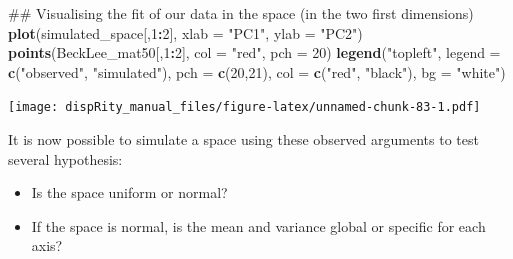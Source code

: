 \documentclass[]{book}
\newenvironment{Shaded}{\begin{snugshade}}{\end{snugshade}}
\newcommand{\KeywordTok}[1]{\textcolor[rgb]{0.13,0.29,0.53}{\textbf{#1}}}
\newcommand{\DataTypeTok}[1]{\textcolor[rgb]{0.13,0.29,0.53}{#1}}
\newcommand{\DecValTok}[1]{\textcolor[rgb]{0.00,0.00,0.81}{#1}}
\newcommand{\StringTok}[1]{\textcolor[rgb]{0.31,0.60,0.02}{#1}}
\newcommand{\OperatorTok}[1]{\textcolor[rgb]{0.81,0.36,0.00}{\textbf{#1}}}
\newcommand{\NormalTok}[1]{#1}
\providecommand{\tightlist}{%
  \setlength{\itemsep}{0pt}\setlength{\parskip}{0pt}}
\theoremstyle{definition}
\theoremstyle{definition}
\theoremstyle{remark}
\begin{document}
\begin{Shaded}
\begin{Highlighting}[]
\NormalTok{## Visualising the fit of our data in the space (in the two first dimensions)}
\KeywordTok{plot}\NormalTok{(simulated_space[,}\DecValTok{1}\OperatorTok{:}\DecValTok{2}\NormalTok{], }\DataTypeTok{xlab =} \StringTok{"PC1"}\NormalTok{, }\DataTypeTok{ylab =} \StringTok{"PC2"}\NormalTok{)}
\KeywordTok{points}\NormalTok{(BeckLee_mat50[,}\DecValTok{1}\OperatorTok{:}\DecValTok{2}\NormalTok{], }\DataTypeTok{col =} \StringTok{"red"}\NormalTok{, }\DataTypeTok{pch =} \DecValTok{20}\NormalTok{)}
\KeywordTok{legend}\NormalTok{(}\StringTok{"topleft"}\NormalTok{, }\DataTypeTok{legend =} \KeywordTok{c}\NormalTok{(}\StringTok{"observed"}\NormalTok{, }\StringTok{"simulated"}\NormalTok{),}
        \DataTypeTok{pch =} \KeywordTok{c}\NormalTok{(}\DecValTok{20}\NormalTok{,}\DecValTok{21}\NormalTok{), }\DataTypeTok{col =} \KeywordTok{c}\NormalTok{(}\StringTok{"red"}\NormalTok{, }\StringTok{"black"}\NormalTok{), }\DataTypeTok{bg =} \StringTok{"white"}\NormalTok{)}
\end{Highlighting}
\end{Shaded}

\texttt{[image: dispRity\_manual\_files/figure-latex/unnamed-chunk-83-1.pdf]}

It is now possible to simulate a space using these observed arguments to
test several hypothesis:

\begin{itemize}
\tightlist
\item
  Is the space uniform or normal?
\item
  If the space is normal, is the mean and variance global or specific
  for each axis?
\end{itemize}
\end{document}
